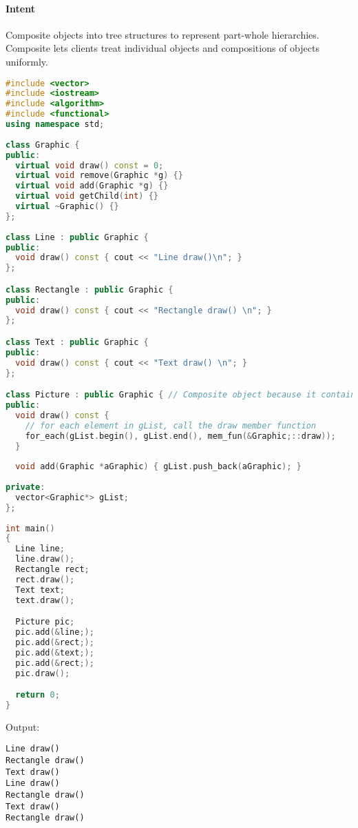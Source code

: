 \documentclass{book}
\begin{document}
\paragraph{Intent}
Composite objects into tree structures to represent part-whole hierarchies.
Composite lets clients treat individual objects and compositions of objects uniformly.

\begin{figure}[h]
\begin{floatrow}
\end{floatrow}
\end{figure}

\begin{lstlisting}[caption={Composite Pattern - sample 1}, language=c++]
#include <vector>
#include <iostream> 
#include <algorithm> 
#include <functional> 
using namespace std;
 
class Graphic {
public:
  virtual void draw() const = 0;
  virtual void remove(Graphic *g) {}
  virtual void add(Graphic *g) {}
  virtual void getChild(int) {}
  virtual ~Graphic() {}
};
 
class Line : public Graphic {
public:
  void draw() const { cout << "Line draw()\n"; }
};

class Rectangle : public Graphic {
public:
  void draw() const { cout << "Rectangle draw() \n"; }
};

class Text : public Graphic {
public:
  void draw() const { cout << "Text draw() \n"; }
};

class Picture : public Graphic { // Composite object because it contain line, Rectangle and Text
public:
  void draw() const {
    // for each element in gList, call the draw member function
    for_each(gList.begin(), gList.end(), mem_fun(&Graphic;::draw));
  }
 
  void add(Graphic *aGraphic) { gList.push_back(aGraphic); }
 
private:
  vector<Graphic*> gList;
};
 
int main()
{
  Line line;
  line.draw();
  Rectangle rect;
  rect.draw();
  Text text;
  text.draw();

  Picture pic;
  pic.add(&line;);
  pic.add(&rect;);
  pic.add(&text;);
  pic.add(&rect;);
  pic.draw();

  return 0;
}
\end{lstlisting}
Output:
\begin{verbatim}
Line draw()
Rectangle draw()
Text draw()
Line draw()
Rectangle draw()
Text draw()
Rectangle draw()
\end{verbatim}
\end{document}
